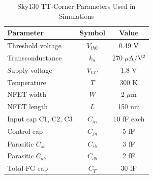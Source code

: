 \begin{table}[h]
\centering
\caption{Sky130 TT-Corner Parameters Used in Simulations}
\begin{tabular}{lcc}
\hline
Parameter & Symbol & Value \\
\hline
Threshold voltage & $V_{th0}$ & 0.49 V \\
Transconductance & $k_n$ & 270 $\mu$A/V$^2$ \\
Supply voltage & $V_{CC}$ & 1.8 V \\
Temperature & $T$ & 300 K \\
NFET width & $W$ & 2 $\mu$m \\
NFET length & $L$ & 150 nm \\
Input cap C1, C2, C3 & $C_{in}$ & 10 fF each \\
Control cap & $C_{fg}$ & 5 fF \\
Parasitic $C_{sb}$ & $C_{sb}$ & 3 fF \\
Parasitic $C_{db}$ & $C_{db}$ & 2 fF \\
Total FG cap & $C_T$ & 30 fF \\
\hline
\end{tabular}
\end{table}

